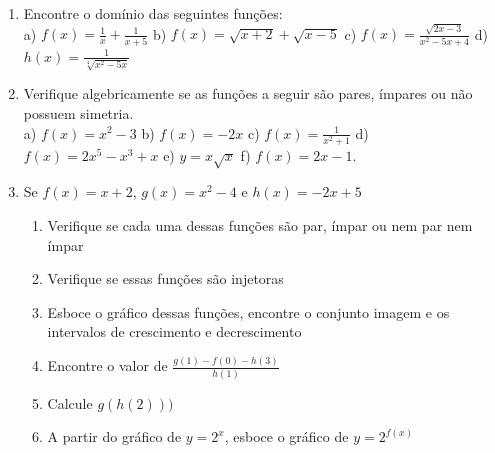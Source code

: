 \begin{enumerate}
\item Encontre o domínio das seguintes funções: \\
a) $f(x)= \frac{1}{x}+ \frac{1}{x+5}$ \hspace{1cm} b) $f(x)= \sqrt{x+2}+ \sqrt{x-5}$ \hspace{1cm} c) $f(x)=\frac{\sqrt{2x-3}}{x^2-5x+4}$ \hspace{1cm} d) $h(x)= \frac{1}{\sqrt[4]{x^2-5x}}$

\item Verifique algebricamente se as funções a seguir são pares, ímpares ou não possuem simetria. \\
a) $f(x)= x^2-3$ \hspace{1cm} b) $f(x)=-2x$ \hspace{1cm}  c) $f(x)=\frac{1}{x^2+1}$\hspace{1cm} d) $f(x)=2x^5-x^3+x$   \hspace{1cm} e) $y=x \sqrt{x}$ \hspace{1cm} f) $f(x)=2x-1$.

\item  Se $f(x)=x+2$, $g(x)=x^2-4$ e $h(x)=-2x+5$
\begin{enumerate}
\item Verifique se cada uma dessas funções são par, ímpar ou nem par nem ímpar
\item Verifique se essas funções são injetoras
\item Esboce o gráfico dessas funções, encontre o conjunto imagem e os intervalos de crescimento e decrescimento
\item Encontre o valor de  $\frac{g(1)-f(0)-h(3)}{h(1)}$
\item Calcule $g(h(2)))$
\item A partir do gráfico de $y=2^x$, esboce o gráfico de $y= 2^{f(x)}$
\end{enumerate}



\end{enumerate}
